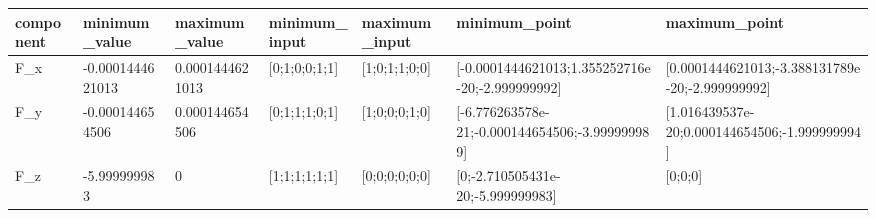 \begin{tabular}{@{}lllllll@{}}
\toprule
component & minimum\_value & maximum\_value & minimum\_input & maximum\_input & minimum\_point & maximum\_point \\
\midrule
F\_x & -0.0001444621013 & 0.0001444621013 & [0;1;0;0;1;1] & [1;0;1;1;0;0] & [-0.0001444621013;1.355252716e-20;-2.999999992] & [0.0001444621013;-3.388131789e-20;-2.999999992] \\
F\_y & -0.000144654506 & 0.000144654506 & [0;1;1;1;0;1] & [1;0;0;0;1;0] & [-6.776263578e-21;-0.000144654506;-3.999999989] & [1.016439537e-20;0.000144654506;-1.999999994] \\
F\_z & -5.999999983 & 0 & [1;1;1;1;1;1] & [0;0;0;0;0;0] & [0;-2.710505431e-20;-5.999999983] & [0;0;0] \\
\bottomrule
\end{tabular}
